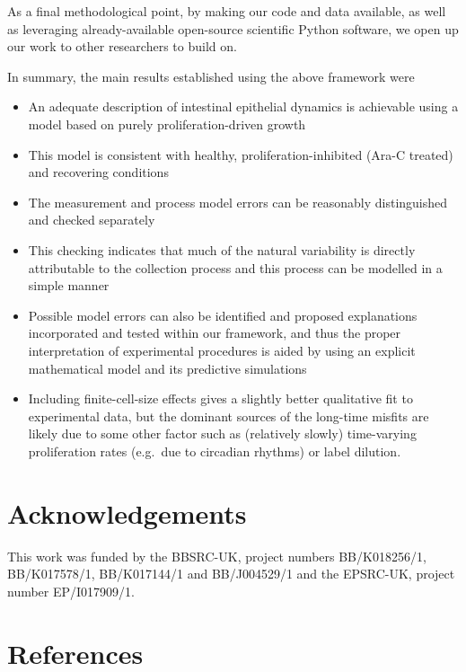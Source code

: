 \documentclass[10pt,letterpaper]{article}
\def\tightlist{}
\begin{document}
As a final methodological point, by making our code and data available,
as well as leveraging already-available open-source scientific Python
software, we open up our work to other researchers to build on.

In summary, the main results established using the above framework were

\begin{itemize}
\tightlist
\item
  An adequate description of intestinal epithelial dynamics is
  achievable using a model based on purely proliferation-driven growth
\item
  This model is consistent with healthy, proliferation-inhibited (Ara-C
  treated) and recovering conditions
\item
  The measurement and process model errors can be reasonably
  distinguished and checked separately
\item
  This checking indicates that much of the natural variability is
  directly attributable to the collection process and this process can
  be modelled in a simple manner
\item
  Possible model errors can also be identified and proposed explanations
  incorporated and tested within our framework, and thus the proper
  interpretation of experimental procedures is aided by using an
  explicit mathematical model and its predictive simulations
\item
  Including finite-cell-size effects gives a slightly better qualitative
  fit to experimental data, but the dominant sources of the long-time
  misfits are likely due to some other factor such as (relatively
  slowly) time-varying proliferation rates (e.g.~due to circadian
  rhythms) or label dilution.
\end{itemize}

\section{Acknowledgements}\label{acknowledgements}

This work was funded by the BBSRC-UK, project numbers BB/K018256/1,
BB/K017578/1, BB/K017144/1 and BB/J004529/1 and the EPSRC-UK, project
number EP/I017909/1.

\nolinenumbers

\section*{References}\label{references}
\end{document}
